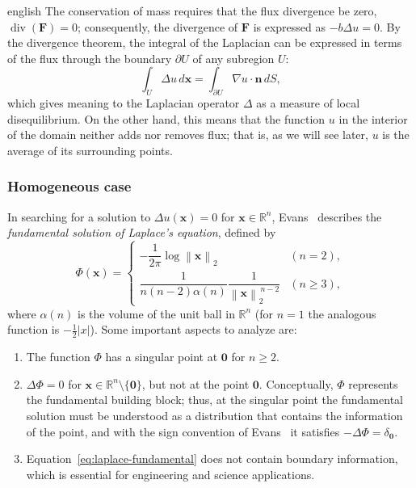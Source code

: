 \documentclass[12pt,letterpaper,twoside]{book}
\newcommand{\norm}[1]{\left\lVert #1 \right\rVert}
\newcommand{\abs}[1]{\left\lvert #1 \right\rvert}
\begin{document}
\begin{hyphenrules}{english}
The conservation of mass requires that the flux divergence be zero, $\operatorname{div}(\mathbf{F})=0$;
consequently, the divergence of $\mathbf{F}$ is expressed as $-b\Delta u=0$. By the divergence theorem, the
integral of the Laplacian can be expressed in terms of the flux through the boundary $\partial U$ of any
subregion $U$:
\begin{equation}
  \int_U\Delta u\,d\mathbf{x}=\int_{\partial U}\nabla u\cdot\mathbf{n}\,d S,
  \label{eq:laplace-flux}
\end{equation}
which gives meaning to the Laplacian operator $\Delta$ as a measure of local disequilibrium. On the other
hand, this means that the function $u$ in the interior of the domain neither adds nor removes flux;
that is, as we will see later, $u$ is the average of its surrounding points.

\subsubsection{Homogeneous case}
In searching for a solution to $\Delta u(\mathbf{x})=0$ for $\mathbf{x}\in\mathbb{R}^n$, Evans~\cite{evans2010} describes the
\emph{fundamental solution of Laplace's equation}, defined by
\begin{equation}
  \Phi(\mathbf{x})=
  \begin{cases}
    -\dfrac{1}{2\pi}\log\norm{\mathbf{x}}_2 & (n=2),\\[2mm]
    \dfrac{1}{n(n-2)\alpha(n)}\dfrac{1}{\norm{\mathbf{x}}_2^{\,n-2}} & (n\ge3),
  \end{cases}
  \label{eq:laplace-fundamental}
\end{equation}
where $\alpha(n)$ is the volume of the unit ball in $\mathbb{R}^n$ (for $n=1$ the analogous function is
$-\tfrac12\abs{x}$). Some important aspects to analyze are:
\begin{enumerate}
  \item The function $\Phi$ has a singular point at $\mathbf{0}$ for $n\ge2$.
  \item $\Delta\Phi=0$ for $\mathbf{x}\in\mathbb{R}^n\setminus\{\mathbf{0}\}$, but not at the point $\mathbf{0}$.
    Conceptually, $\Phi$ represents the fundamental building block; thus, at the singular point the
    fundamental solution must be understood as a distribution that contains the information of the
    point, and with the sign convention of Evans~\cite{evans2010} it satisfies $-\Delta\Phi=\delta_{\mathbf{0}}$.
  \item Equation~\eqref{eq:laplace-fundamental} does not contain boundary information, which is essential for
    engineering and science applications.
\end{enumerate}


\end{hyphenrules}
\end{document}
